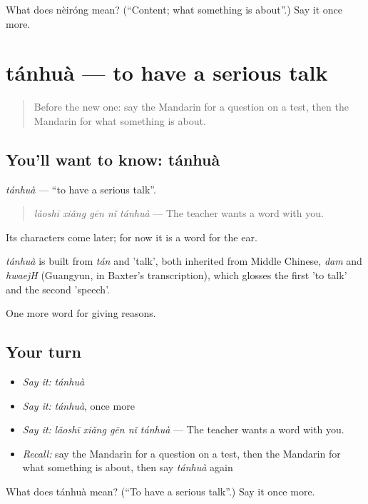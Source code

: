 \begin{tcolorbox}[breakable,colback=teal!4,colframe=teal!35!black,title={Before you move on}]
What does nèiróng mean? (\textquotedblleft{}Content; what something is about\textquotedblright{}.) Say it once more.
\end{tcolorbox}
\section[tánhuà]{tánhuà — to have a serious talk}

\label{lesson:ZH-C354-tanhua}



\begin{quote}
Before the new one: say the Mandarin for a question on a test, then the Mandarin for what something is about.
\end{quote}

\subsection*{You'll want to know: tánhuà}
\emph{tánhuà} — \textquotedblleft{}to have a serious talk\textquotedblright{}.

\begin{quote}
\emph{lǎoshī xiǎng gēn nǐ tánhuà} — The teacher wants a word with you.
\end{quote}

Its characters come later; for now it is a word for the ear.

\begin{cousinweb}
\emph{tánhuà} is built from \emph{tán} and  'talk', both inherited from Middle Chinese, \emph{dam} and \emph{hwaejH} (Guangyun, in Baxter's transcription), which glosses the first 'to talk' and the second 'speech'.
\end{cousinweb}

\begin{grammarlens}[title={What you've built}]
One more word for giving reasons.
\end{grammarlens}

\subsection*{Your turn}
\begin{itemize}
\raggedright
  \item \emph{Say it:} \emph{tánhuà}
  \item \emph{Say it:} \emph{tánhuà}, once more
  \item \emph{Say it:} \emph{lǎoshī xiǎng gēn nǐ tánhuà} — The teacher wants a word with you.
  \item \emph{Recall:} say the Mandarin for a question on a test, then the Mandarin for what something is about, then say \emph{tánhuà} again
\end{itemize}

\begin{tcolorbox}[breakable,colback=teal!4,colframe=teal!35!black,title={Before you move on}]
What does tánhuà mean? (\textquotedblleft{}To have a serious talk\textquotedblright{}.) Say it once more.
\end{tcolorbox}

